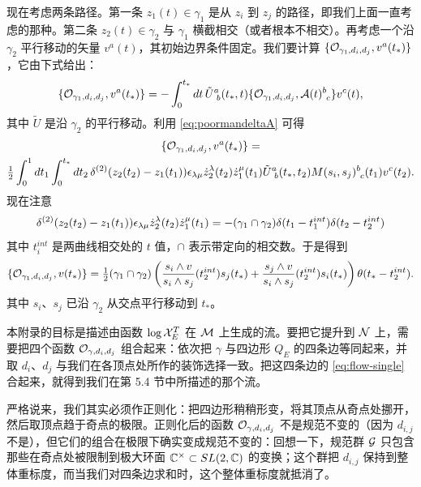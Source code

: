现在考虑两条路径。第一条 $z_1(t)\in \gamma_1$ 是从 $z_i$ 到 $z_j$ 的路径，即我们上面一直考虑的那种。第二条 $z_2(t) \in \gamma_2$ 与 $\gamma_1$ 横截相交（或者根本不相交）。再考虑一个沿 $\gamma_2$ 平行移动的矢量 $v^a(t)$，其初始边界条件固定。我们要计算 $\{\mathcal{O}_{\gamma_1, d_i, d_j}, v^a(t_*)\}$，它由下式给出：
\begin{equation}
\{ \mathcal{O}_{\gamma_1, d_i, d_j}, v^a(t_*) \} = - \int_0^{t_*} dt \, \tilde U^{a}_{~b}(t_*, t)
\{\mathcal{O}_{\gamma_1, d_i, d_j}, \mathcal{A}(t)^{b}_{~c} \} v^c(t),
\end{equation}
其中 $\tilde U$ 是沿 $\gamma_2$ 的平行移动。利用 \eqref{eq:poormandeltaA} 可得
\begin{multline}
\{ \mathcal{O}_{\gamma_1, d_i, d_j}, v^a(t_*) \} =  \\
\tfrac{1}{2} \int_0^1 dt_1 \int_0^{t_*} dt_2\,
\delta^{(2)}(z_2(t_2)-z_1(t_1))\epsilon_{\lambda\mu} \dot
z_2^\lambda(t_2) \dot z_1^\mu(t_1) \tilde{U}^a_{~b}(t_*,t_2)
M(s_i,s_j)^{b}_{~c}(t_1) v^c(t_2).
\end{multline}
现在注意
\begin{equation}
\delta^{(2)}(z_2(t_2)-z_1(t_1))\epsilon_{\lambda\mu} \dot
z_2^\lambda(t_2) \dot z_1^\mu(t_1)  = -(\gamma_1\cap
\gamma_2)\delta(t_1-t_1^{int}) \delta(t_2-t_2^{int})
\end{equation}
其中 $t_i^{int}$ 是两曲线相交处的 $t$ 值，$\cap$ 表示带定向的相交数。于是得到
\begin{equation} \label{eq:flow-single}
\{ \mathcal{O}_{\gamma_1, d_i, d_j}, v(t_*) \} =  \tfrac{1}{2} (\gamma_1 \cap
\gamma_2) \left( \frac{s_i \wedge v}{s_i \wedge s_j}(t_2^{int})
s_j(t_*) + \frac{s_j \wedge v}{s_i \wedge s_j}(t_2^{int}) s_i(t_*)
\right) \theta(t_* - t_2^{int}).
\end{equation}
其中 $s_i$、$s_j$ 已沿 $\gamma_2$ 从交点平行移动到 $t_*$。

本附录的目标是描述由函数 $\log \mathcal{X}^T_E$ 在 $\mathcal{M}$ 上生成的流。要把它提升到 $\mathcal{N}$ 上，需要把四个函数 $\mathcal{O}_{\gamma, d_i, d_j}$ 组合起来：依次把 $\gamma$ 与四边形 $Q_E$ 的四条边等同起来，并取 $d_i$、$d_j$ 与我们在各顶点处所作的装饰选择一致。把这四条边的 \eqref{eq:flow-single} 合起来，就得到我们在第 5.4 节中所描述的那个流。%

严格说来，我们其实必须作正则化：把四边形稍稍形变，将其顶点从奇点处挪开，然后取顶点趋于奇点的极限。正则化后的函数 $\mathcal{O}_{\gamma, d_i, d_j}$ 不是规范不变的（因为 $d_{i,j}$ 不是），但它们的组合在极限下确实变成规范不变的：回想一下，规范群 $\mathcal{G}$ 只包含那些在奇点处被限制到极大环面 $\mathbb{C}^\times \subset SL(2,\mathbb{C})$ 的变换；这个群把 $d_{i,j}$ 保持到整体重标度，而当我们对四条边求和时，这个整体重标度就抵消了。
